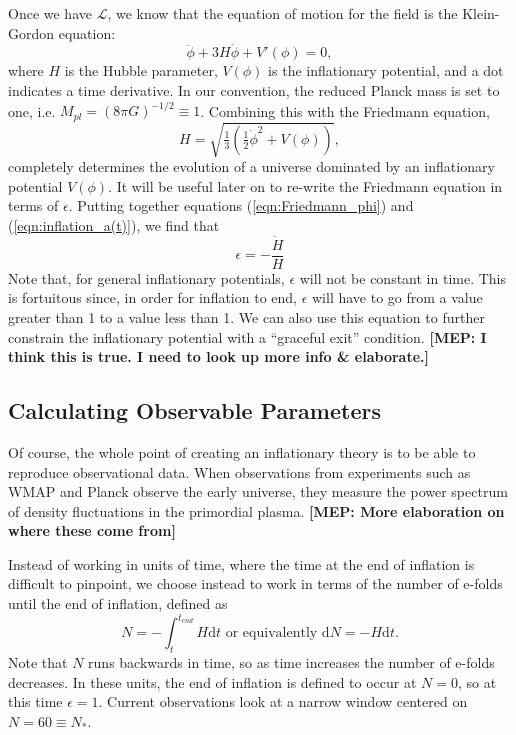 \documentclass[onecolumn,apj]{emulateapj}
\def\d{\mathrm{d}}
\def\L{\mathscr{L}}
\def\half{\tfrac{1}{2}}
\newcommand{\mep}[1]{{\color{applegreen} \textbf{[MEP:  #1]}}}
\begin{document}
Once we have $\L$, we know that the equation of motion for the field is the Klein-Gordon equation:
\begin{equation}
\ddot \phi + 3H \dot \phi + V'(\phi) = 0,
\label{eqn:KG}
\end{equation}
where $H$ is the Hubble parameter, $V(\phi)$ is the inflationary potential, and a dot indicates a time derivative. In our convention, the reduced Planck mass is set to one, i.e. $M_{pl} = (8\pi G)^{-1/2} \equiv 1$. Combining this with the Friedmann equation, 
\begin{equation}
H = \sqrt{\tfrac{1}{3} \left ( \half \dot \phi^2 + V(\phi) \right )},
\label{eqn:Friedmann}
\end{equation}
completely determines the evolution of a universe dominated by an inflationary potential $V(\phi)$. It will be useful later on to re-write the Friedmann equation in terms of $\epsilon$. Putting together equations (\ref{eqn:Friedmann_phi}) and (\ref{eqn:inflation_a(t)}), we find that
\begin{equation}
\epsilon = -\frac{\dot H}{H}
\label{eqn:Friedmann_epsilon}
\end{equation}
Note that, for general inflationary potentials, $\epsilon$ will not be constant in time. This is fortuitous since, in order for inflation to end, $\epsilon$ will have to go from a value greater than 1 to a value less than 1. We can also use this equation to further constrain the inflationary potential with a ``graceful exit'' condition. \mep{I think this is true. I need to look up more info \& elaborate.}

\subsection{Calculating Observable Parameters}
Of course, the whole point of creating an inflationary theory is to be able to reproduce observational data. When observations from experiments such as WMAP and Planck observe the early universe, they measure the power spectrum of density fluctuations in the primordial plasma. \mep{More elaboration on where these come from}

Instead of working in units of time, where the time at the end of inflation is difficult to pinpoint, we choose instead to work in terms of the number of e-folds until the end of inflation, defined as 
\begin{equation}
N = -\int_t^{t_{end}} H \d t \text{\ \ \ or\ equivalently\ \ \ } \d N = -H \d t. 
\label{eqn:defN}
\end{equation}
Note that $N$ runs backwards in time, so as time increases the number of e-folds decreases. In these units, the end of inflation is defined to occur at $N=0$, so at this time $\epsilon=1$. Current observations look at a narrow window centered on $N=60\equiv N_*$.  
\end{document}
